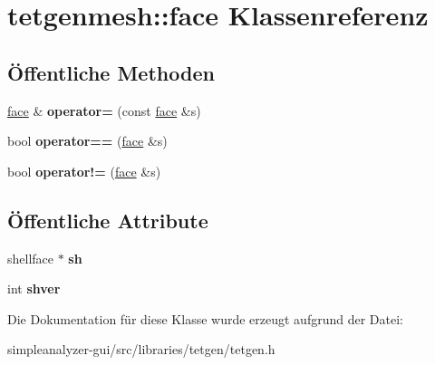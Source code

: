 \hypertarget{classtetgenmesh_1_1face}{\section{tetgenmesh\-:\-:face Klassenreferenz}
\label{classtetgenmesh_1_1face}
}
\subsection*{Öffentliche Methoden}
\begin{DoxyCompactItemize}
\item 
\hypertarget{classtetgenmesh_1_1face_a1321d78f189cee6bc26d71a985ee8dbe}{\hyperlink{classtetgenmesh_1_1face}{face} \& {\bfseries operator=} (const \hyperlink{classtetgenmesh_1_1face}{face} \&s)}\label{classtetgenmesh_1_1face_a1321d78f189cee6bc26d71a985ee8dbe}

\item 
\hypertarget{classtetgenmesh_1_1face_ae983f5faf62515e07c491e22f9249a6e}{bool {\bfseries operator==} (\hyperlink{classtetgenmesh_1_1face}{face} \&s)}\label{classtetgenmesh_1_1face_ae983f5faf62515e07c491e22f9249a6e}

\item 
\hypertarget{classtetgenmesh_1_1face_adbdb7e1a39ec0c3d92e7281b52e33ae3}{bool {\bfseries operator!=} (\hyperlink{classtetgenmesh_1_1face}{face} \&s)}\label{classtetgenmesh_1_1face_adbdb7e1a39ec0c3d92e7281b52e33ae3}

\end{DoxyCompactItemize}
\subsection*{Öffentliche Attribute}
\begin{DoxyCompactItemize}
\item 
\hypertarget{classtetgenmesh_1_1face_a0ebac53728a624fcb6528a7d2571b987}{shellface $\ast$ {\bfseries sh}}\label{classtetgenmesh_1_1face_a0ebac53728a624fcb6528a7d2571b987}

\item 
\hypertarget{classtetgenmesh_1_1face_a990a58ccf240d0d4197c2a923a1853d6}{int {\bfseries shver}}\label{classtetgenmesh_1_1face_a990a58ccf240d0d4197c2a923a1853d6}

\end{DoxyCompactItemize}


Die Dokumentation für diese Klasse wurde erzeugt aufgrund der Datei\-:\begin{DoxyCompactItemize}
\item 
simpleanalyzer-\/gui/src/libraries/tetgen/tetgen.\-h\end{DoxyCompactItemize}
